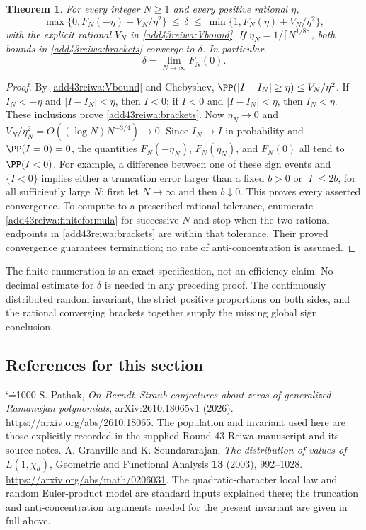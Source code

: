 \documentclass[11pt,a4paper]{article}
\makeatletter
\numberwithin{equation}{section}
\newtheorem{theorem}{Theorem}[section]
\theoremstyle{definition}
\theoremstyle{remark}
\renewenvironment{thebibliography}[1]
 {\subsection*{References for this section}\small
  \list{\@biblabel{\@arabic\c@enumiv}}
       {\settowidth\labelwidth{\@biblabel{#1}}\leftmargin\labelwidth
        \advance\leftmargin\labelsep\@openbib@code
        \usecounter{enumiv}\let\p@enumiv\@empty
        \renewcommand\theenumiv{\@arabic\c@enumiv}}
  \sloppy\clubpenalty4000\widowpenalty4000\sfcode`\.=1000\relax}
 {\def\@noitemerr{\@latex@warning{Empty bibliography}}\endlist}
\makeatother
\begin{document}
\begin{theorem}\label{add43reiwa:compute}
For every integer $N\ge1$ and every positive rational $\eta$,
\begin{equation}\label{add43reiwa:brackets}
 \max\{0,F_N(-\eta)-V_N/\eta^2\}
       \ \le\ \delta\ \le\
 \min\{1,F_N(\eta)+V_N/\eta^2\},
\end{equation}
with the explicit rational $V_N$ in \eqref{add43reiwa:Vbound}. If
$\eta_N=1/\lceil N^{1/8}\rceil$, both bounds in
\eqref{add43reiwa:brackets} converge to $\delta$. In particular,
\begin{equation}\label{add43reiwa:deltalimit}
                         \delta=\lim_{N\to\infty}F_N(0).
\end{equation}
\end{theorem}
\begin{proof}
By \eqref{add43reiwa:Vbound} and Chebyshev,
$\PP(|I-I_N|\ge\eta)\le V_N/\eta^2$.
If $I_N<-\eta$ and $|I-I_N|<\eta$, then $I<0$;
if $I<0$ and $|I-I_N|<\eta$, then $I_N<\eta$.
These inclusions prove \eqref{add43reiwa:brackets}.
Now $\eta_N\to0$ and
$V_N/\eta_N^2=O((\log N)N^{-3/4})\to0$.
Since $I_N\to I$ in probability and $\PP(I=0)=0$, the quantities
$F_N(-\eta_N)$, $F_N(\eta_N)$, and $F_N(0)$ all tend to
$\PP(I<0)$. For example, a difference between one of these sign
events and $\{I<0\}$ implies either a truncation error larger than
a fixed $b>0$ or $|I|\le2b$, for all sufficiently large $N$;
first let $N\to\infty$ and then $b\downarrow0$.
This proves every asserted convergence. To compute to a prescribed
rational tolerance, enumerate \eqref{add43reiwa:finiteformula} for successive
$N$ and stop when the two rational endpoints in \eqref{add43reiwa:brackets}
are within that tolerance. Their proved convergence guarantees
termination; no rate of anti-concentration is assumed.
\end{proof}

The finite enumeration is an exact specification, not an efficiency
claim. No decimal estimate for $\delta$ is needed in any preceding
proof. The continuously distributed random invariant, the strict
positive proportions on both sides, and the rational converging
brackets together supply the missing global sign conclusion.

\begin{thebibliography}{9}
 S. Pathak,
\emph{On Berndt--Straub conjectures about zeros of generalized
Ramanujan polynomials}, arXiv:2610.18065v1 (2026).
\url{https://arxiv.org/abs/2610.18065}.
The population and invariant used here are those explicitly recorded
in the supplied Round 43 Reiwa manuscript and its source notes.
 A. Granville and K. Soundararajan,
\emph{The distribution of values of $L(1,\chi_d)$},
Geometric and Functional Analysis \textbf{13} (2003), 992--1028.
\url{https://arxiv.org/abs/math/0206031}.
The quadratic-character local law and random Euler-product model are
standard inputs explained there; the truncation and anti-concentration
arguments needed for the present invariant are given in full above.
\end{thebibliography}
\end{document}
